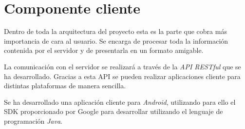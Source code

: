 \section{Componente cliente}

Dentro de toda la arquitectura del proyecto esta es la parte que cobra más importancia de cara al usuario. Se encarga de procesar toda la información contenida por el servidor y de presentarla en un formato amigable.

La comunicación con el servidor se realizará a través de la \emph{API RESTful} que se ha desarrollado. Gracias a esta API se pueden realizar aplicaciones cliente para distintas plataformas de manera sencilla.

Se ha desarrollado una aplicación cliente para \emph{Android}, utilizando para ello el SDK proporcionado por Google para desarrollar utilizando el lenguaje de programación \emph{Java}.